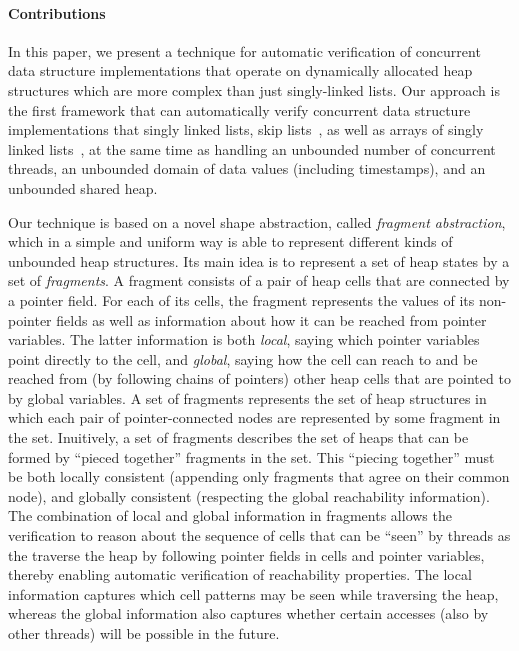 
\paragraph{Contributions}
In this paper, we present a technique for automatic verification of concurrent
data structure implementations that operate on dynamically allocated
heap structures which are more complex than just singly-linked lists.
Our approach is the first framework that
can automatically verify concurrent data structure implementations that
singly linked lists, skip lists~\cite{Fomitchev:2004,ArtOfMpP,Sundell:2005},
as well as arrays of singly linked lists~\cite{ts-stack},
at the same time as handling an unbounded
number of concurrent threads, an unbounded domain of data values
(including timestamps), and an unbounded shared heap.

Our technique is based on a novel shape abstraction,
called {\em fragment abstraction}, which in a simple and uniform way is able to
represent different kinds of unbounded heap structures.
Its main idea is to represent a set of heap states by a set of {\em fragments}.
A fragment consists of a pair of heap cells that are connected by a pointer field.
For each of its cells, the fragment represents
the values of its non-pointer
fields as well as information about how it can be reached from pointer
variables. The latter information is both {\em local}, saying which pointer
variables point directly to the cell, and {\em global}, saying how the
cell can reach to and be reached from (by following chains of pointers)
other heap cells that are pointed to by global variables.
A set of fragments represents the set of heap
structures in which each pair of pointer-connected nodes are represented by some
fragment in the set.
Inuitively, a set of fragments describes the set of heaps that can be formed by
``pieced together'' fragments in the set. This ``piecing together'' must
be both locally consistent (appending only fragments that agree on their
common node), and globally consistent (respecting the global reachability
information).
The combination of local and global information in fragments allows the
verification to reason about the sequence of cells that can be ``seen'' by
threads as the traverse the heap by following pointer fields in cells and
pointer variables, thereby enabling automatic verification of reachability
properties. The local information captures which cell patterns may be
seen while traversing the heap, whereas the global information also
captures whether certain accesses (also by other threads) will be possible
in the future. 

